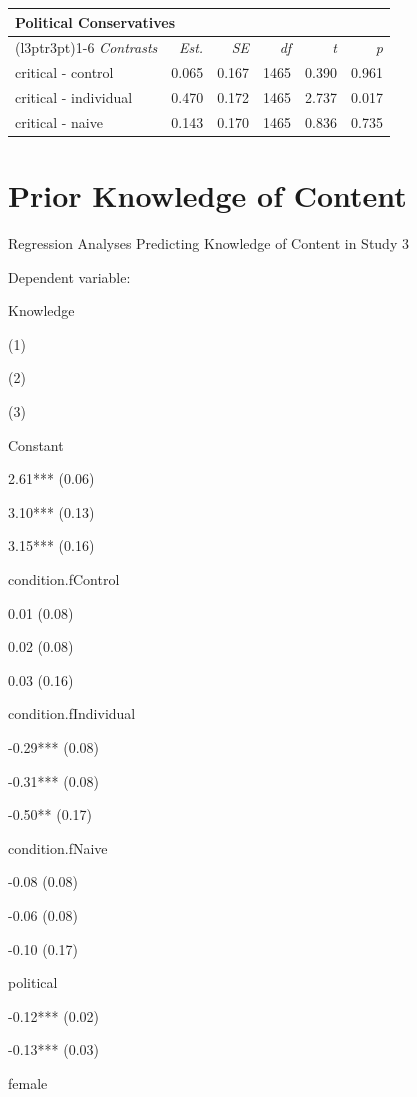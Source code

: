 \documentclass[
]{book}
\begin{document}
\begin{table}
\centering
\fontsize{13}{15}\selectfont
\begin{tabular}{lrrrrr}
\toprule
\multicolumn{6}{l}{Political Conservatives} \\
\cmidrule(l{3pt}r{3pt}){1-6}
\em{Contrasts} & \em{Est.} & \em{SE} & \em{df} & \em{t} & \em{p}\\
\midrule
critical - control & 0.065 & 0.167 & 1465 & 0.390 & 0.961\\
critical - individual & 0.470 & 0.172 & 1465 & 2.737 & 0.017\\
critical - naive & 0.143 & 0.170 & 1465 & 0.836 & 0.735\\
\bottomrule
\end{tabular}
\end{table}

\hypertarget{prior-knowledge-of-content}{%
\section{Prior Knowledge of Content}\label{prior-knowledge-of-content}}

Regression Analyses Predicting Knowledge of Content in Study 3

Dependent variable:

Knowledge

(1)

(2)

(3)

Constant

2.61*** (0.06)

3.10*** (0.13)

3.15*** (0.16)

condition.fControl

0.01 (0.08)

0.02 (0.08)

0.03 (0.16)

condition.fIndividual

-0.29*** (0.08)

-0.31*** (0.08)

-0.50** (0.17)

condition.fNaive

-0.08 (0.08)

-0.06 (0.08)

-0.10 (0.17)

political

-0.12*** (0.02)

-0.13*** (0.03)

female
\end{document}
